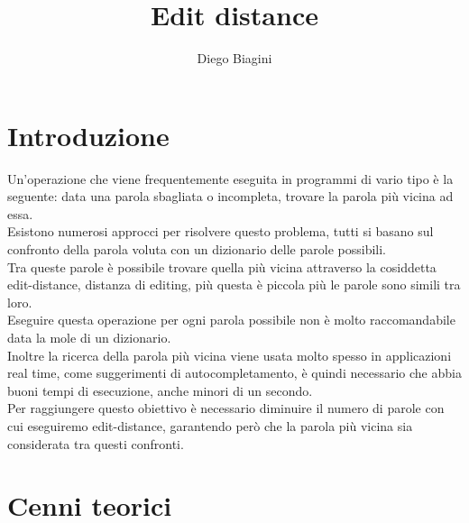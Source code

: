 \documentclass[]{article}
\author{Diego Biagini}
\title{Edit distance}
\begin{document}
\maketitle
\newpage
\section{Introduzione}
Un'operazione che viene frequentemente eseguita in programmi di vario tipo è la seguente: data una parola sbagliata o incompleta, trovare la parola più vicina ad essa.\\
Esistono numerosi approcci per risolvere questo problema, tutti si basano sul confronto della parola voluta con un dizionario delle parole possibili.\\
Tra queste parole è possibile trovare quella più vicina attraverso la cosiddetta edit-distance, distanza di editing, più questa è piccola più le parole sono simili tra loro.\\
Eseguire questa operazione per ogni parola possibile non è molto raccomandabile data la mole di un dizionario.\\
Inoltre la ricerca della parola più vicina viene usata molto spesso in applicazioni real time, come suggerimenti di autocompletamento, è quindi necessario che abbia buoni tempi di esecuzione, anche minori di un secondo.\\
Per raggiungere questo obiettivo è necessario diminuire il numero di parole con cui eseguiremo edit-distance, garantendo però che la parola più vicina sia considerata tra questi confronti.\\
\section{Cenni teorici}
\end{document}
